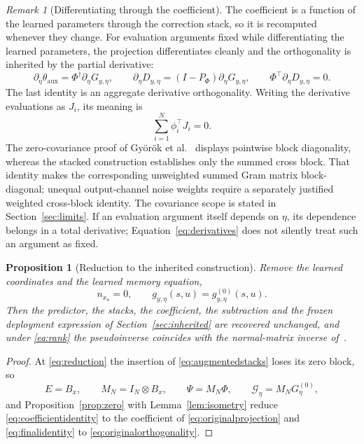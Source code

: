 \documentclass[11pt,a4paper]{article}
\newtheorem{proposition}{Proposition}
\theoremstyle{remark}
\newtheorem{remark}{Remark}
\begin{document}
\begin{remark}[Differentiating through the coefficient]\label{rem:gradients}
The coefficient is a function of the learned parameters through the correction stack, so it is
recomputed whenever they change. For evaluation arguments fixed while differentiating the learned
parameters, the projection differentiates cleanly and the orthogonality is inherited by the
partial derivative:
\begin{equation}\label{eq:derivatives}
\partial_\eta\theta_{\mathrm{aux}}=\Phi^\dagger\partial_\eta G_{y,\eta},\qquad
\partial_\eta D_{y,\eta}=(I-P_\Phi)\partial_\eta G_{y,\eta},\qquad
\Phi^\top\partial_\eta D_{y,\eta}=0.
\end{equation}
The last identity is an aggregate derivative orthogonality. Writing the derivative evaluations
as \(J_i\), its meaning is
\begin{equation*}
\sum_{i=1}^N\phi_i^\top J_i=0.
\end{equation*}
The zero-covariance proof of Gy\"or\"ok et al.~\cite[Thm.~18, Eqs.~(39)--(40)]{gyorok2026obc}
displays pointwise block diagonality, whereas the stacked construction establishes only the
summed cross block. That identity makes the corresponding unweighted summed Gram matrix
block-diagonal; unequal output-channel noise weights require a separately justified weighted
cross-block identity. The covariance scope is stated in Section~\ref{sec:limits}. If an evaluation
argument itself depends on \(\eta\), its dependence belongs in a total derivative;
Equation~\eqref{eq:derivatives} does not silently treat such an argument as fixed.
\end{remark}

\begin{proposition}[Reduction to the inherited construction]\label{prop:reduction}
Remove the learned coordinates and the learned memory equation,
\begin{equation}\label{eq:reduction}
n_{x_a}=0,\qquad g_{y,\eta}(s,u)=g_{y,\eta}^{(0)}(s,u).
\end{equation}
Then the predictor, the stacks, the coefficient, the subtraction and the frozen deployment
expression of Section~\ref{sec:inherited} are recovered unchanged, and under \eqref{eq:rank} the
pseudoinverse coincides with the normal-matrix inverse of~\cite[Eq.~(8)]{gyorok2026obc}.
\end{proposition}

\begin{proof}
At \eqref{eq:reduction} the insertion of \eqref{eq:augmentedstacks} loses its zero block, so
\begin{equation*}
E=B_x,\qquad M_N=I_N\otimes B_x,\qquad \Psi=M_N\Phi,\qquad
\mathcal G_\eta=M_NG_\eta^{(0)},
\end{equation*}
and Proposition~\ref{prop:zero} with Lemma~\ref{lem:isometry} reduce
\eqref{eq:coefficientidentity} to the coefficient of \eqref{eq:originalprojection} and
\eqref{eq:finalidentity} to \eqref{eq:originalorthogonality}.
\end{proof}
\end{document}

